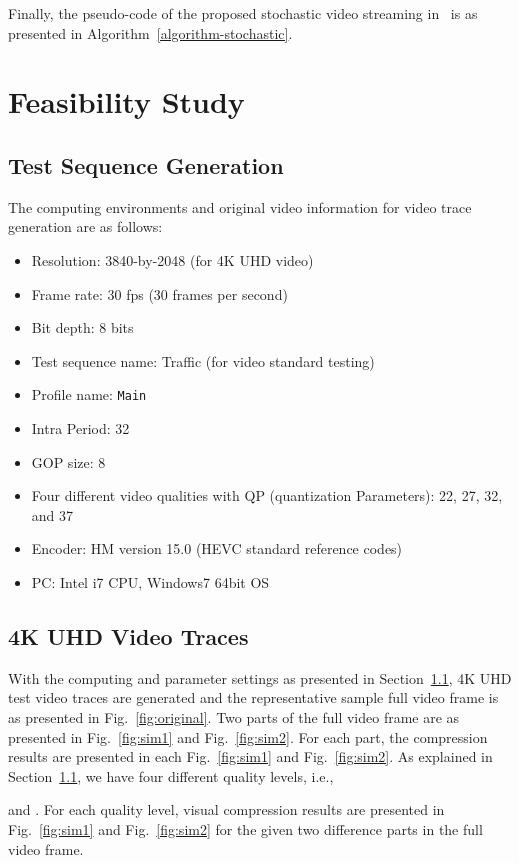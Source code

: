\documentclass[conference]{IEEEtran}
\begin{document}
Finally, the pseudo-code of the proposed stochastic video streaming in~\cite{ton2015kim,arxiv2014kim} is as presented in Algorithm~\ref{algorithm-stochastic}.


\section{Feasibility Study}\label{sec:3}
\subsection{Test Sequence Generation}\label{sec:3-1}
The computing environments and original video information for video trace generation are as follows:
\begin{itemize}
    \item Resolution: 3840-by-2048 (for 4K UHD video)
    \item Frame rate: 30 fps (30 frames per second)
    \item Bit depth: 8 bits
    \item Test sequence name: Traffic (for video standard testing)
    \item Profile name: \texttt{Main}
    \item Intra Period: 32
    \item GOP size: 8
    \item Four different video qualities with QP (quantization Parameters): 22, 27, 32, and 37
    \item Encoder: HM version 15.0 (HEVC standard reference codes)
    \item PC: Intel i7 CPU, Windows7 64bit OS
\end{itemize}


\subsection{4K UHD Video Traces}\label{sec:3-2}


With the computing and parameter settings as presented in Section~\ref{sec:3-1}, 4K UHD test video traces are generated and the representative sample full video frame is as presented in Fig.~\ref{fig:original}.
Two parts of the full video frame are as presented in Fig.~\ref{fig:sim1} and Fig.~\ref{fig:sim2}.
For each part, the compression results are presented in each Fig.~\ref{fig:sim1} and Fig.~\ref{fig:sim2}.
As explained in Section~\ref{sec:3-1}, we have four different quality levels, i.e.,

and .
For each quality level, visual compression results are presented in Fig.~\ref{fig:sim1} and Fig.~\ref{fig:sim2} for the given two difference parts in the full video frame.
\end{document}
